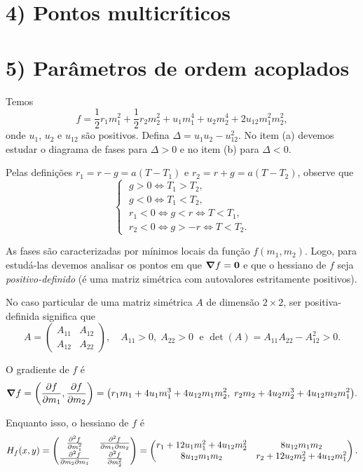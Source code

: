 \documentclass[a4paper,10pt]{article}
\begin{document}
\section*{4) Pontos multicríticos}



\pagebreak

\section*{5) Parâmetros de ordem acoplados}

Temos
$$
f = \frac{1}{2} r_1 m_1^2 + \frac{1}{2} r_2 m_2^2 + u_1 m_1^4 + u_2 m_2^4 + 2 u_{12} m_1^2 m_2^2,
$$
onde $u_1$, $u_2$ e $u_{12}$ são positivos. Defina $\boxed{\Delta = u_1 u_2 - u_{12}^2}$. No item (a) devemos estudar o diagrama de fases para $\Delta > 0$ e no item (b) para $\Delta < 0$.

\n

Pelas definições $r_1 = r - g = a(T-T_1)$ e $r_2 = r+g = a(T-T_2)$, observe que
$$
\begin{cases}
\; g > 0 \iff T_1 > T_2, \\
\; g < 0 \iff T_1 < T_2, \\
\; r_1 < 0 \iff g < r \iff T < T_1, \\
\; r_2 < 0 \iff g > -r \iff T < T_2.
\end{cases}
$$


As fases são caracterizadas por mínimos locais da função $f(m_1, m_2)$. Logo, para estudá-las devemos analisar os pontos em que $\grad{f} = \vb{0}$ e que o hessiano de $f$ seja \textit{positivo-definido} (é uma matriz simétrica com autovalores estritamente positivos).

\n

No caso particular de uma matriz simétrica $A$ de dimensão $2 \times 2$, ser positiva-definida significa que
$$
A =
\begin{pmatrix}
A_{11} & A_{12} \\
A_{12}& A_{22}
\end{pmatrix}
, \quad A_{11} > 0, \; A_{22} > 0 \; \text{ e } \det(A) = A_{11} A_{22} - A_{12}^2 > 0.
$$

O gradiente de $f$ é
$$
\grad{f} = \qty(\pdv{f}{m_1}, \pdv{f}{m_2}) =
\qty(r_1 m_1 + 4u_1 m_1^3 + 4u_{12} m_1 m_2^2, \; r_2 m_2 + 4u_2 m_2^3 + 4u_{12} m_2 m_1^2).
$$

Enquanto isso, o hessiano de $f$ é
$$
H_f(x, y) =
\begin{pmatrix}
\pdv[2]{f}{m_1} & \pdv{f}{m_1}{m_2} \\
\pdv{f}{m_2}{m_1} & \pdv[2]{f}{m_2}
\end{pmatrix}
=
\begin{pmatrix}
r_1 + 12 u_1 m_1^2 + 4 u_{12} m_2^2  & 8 u_{12} m_1 m_2 \\
8 u_{12} m_1 m_2 & r_2 + 12 u_2 m_2^2 + 4 u_{12} m_1^2
\end{pmatrix}.
$$
\end{document}
